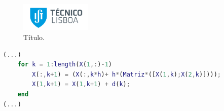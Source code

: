 \begin{figure}
    \centering
    \includegraphics[width=0.3\textwidth]{imagens/ist.png}
    \caption{Título.}
    \label{fig:exemplo.4}
\end{figure}


\begin{lstlisting}[frame=none,language=Matlab,label={code:exemplo},firstnumber=1,backgroundcolor=\color{gray!15}, basicstyle=\tiny\ttfamily]
(...)
    for k = 1:length(X(1,:)-1)
        X(:,k+1) = (X(:,k*h)+ h*(Matriz*([X(1,k);X(2,k)])));
        X(1,k+1) = X(1,k+1) + d(k);
    end
(...)
\end{lstlisting}
